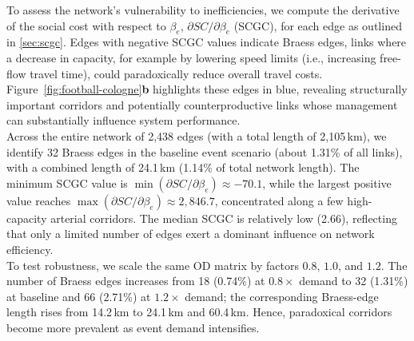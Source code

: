 \documentclass[twocolumn,english,groupedaddress, superscriptaddress,aps,pre,10pt,floatfix]{revtex4-2}
\begin{document}
To assess the network’s vulnerability to inefficiencies, we compute the derivative of the social cost with respect to $\beta_e$, $\partial SC/\partial \beta_e$ (SCGC), for each edge as outlined in \cref{sec:scgc}. 
Edges with negative SCGC values indicate Braess edges, links where a decrease in capacity, for example by lowering speed limits (i.e., increasing free-flow travel time), could paradoxically reduce overall travel costs. 
Figure~\ref{fig:football-cologne}\textbf{b} highlights these edges in blue, revealing structurally important corridors and potentially counterproductive links whose management can substantially influence system performance.\\

Across the entire network of 2,438 edges (with a total length of 2,105\,km), we identify 32 Braess edges in the baseline event scenario (about 1.31\% of all links), with a combined length of 24.1\,km (1.14\% of total network length). 
The minimum SCGC value is $\min(\partial SC/\partial \beta_e) \approx -70.1$, while the largest positive value reaches $\max(\partial SC/\partial \beta_e) \approx 2{,}846.7$, concentrated along a few high-capacity arterial corridors. 
The median SCGC is relatively low (2.66), reflecting that only a limited number of edges exert a dominant influence on network efficiency.\\

To test robustness, we scale the same OD matrix by factors $0.8$, $1.0$, and $1.2$. 
The number of Braess edges increases from 18 (0.74\%) at $0.8\times$ demand to 32 (1.31\%) at baseline and 66 (2.71\%) at $1.2\times$ demand; the corresponding Braess-edge length rises from 14.2\,km to 24.1\,km and 60.4\,km. 
Hence, paradoxical corridors become more prevalent as event demand intensifies.\\
\end{document}
